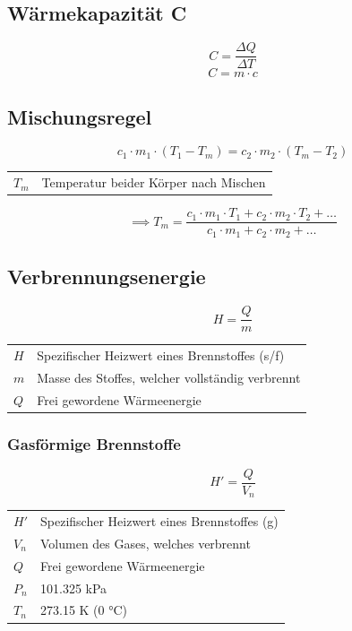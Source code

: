 \documentclass[a4paper]{IEEEtran}
\makeatletter
\newenvironment{conditions}
  {\par\vspace{\abovedisplayskip}\noindent\begin{tabular}{>{$}l<{$} @{${}={}$} l}}
  {\end{tabular}\par\vspace{\belowdisplayskip}}
\makeatother
\begin{document}
  \subsection{Wärmekapazität C}
  \begin{equation}
    C = \frac{\Delta Q}{\Delta T}
  \end{equation}
  \begin{equation}
    C = m \cdot c
  \end{equation}
  \subsection{Mischungsregel}
  \begin{equation}
    c_1 \cdot m_1 \cdot (T_1 - T_m) = c_2 \cdot m_2 \cdot (T_m - T_2)
  \end{equation}
  \begin{conditions}
    T_m & Temperatur beider Körper nach Mischen
  \end{conditions}
  \begin{equation}
    \implies T_m = \frac{c_1 \cdot m_1 \cdot T_1 + c_2 \cdot m_2 \cdot T_2 + \ldots}{c_1 \cdot m_1 + c_2 \cdot m_2 + \ldots}
  \end{equation}

  \subsection{Verbrennungsenergie}
  \begin{equation}
    H = \frac{Q}{m}
  \end{equation}
  \begin{conditions}
    H & Spezifischer Heizwert eines Brennstoffes (s/f) \\
    m & Masse des Stoffes, welcher vollständig verbrennt \\
    Q & Frei gewordene Wärmeenergie
  \end{conditions}

  \subsubsection{Gasförmige Brennstoffe}
  \begin{equation}
    H' = \frac{Q}{V_n}
  \end{equation}
  \begin{conditions}
    H' & Spezifischer Heizwert eines Brennstoffes (g) \\
    V_n & Volumen des Gases, welches verbrennt \\
    Q & Frei gewordene Wärmeenergie \\
    P_n & 101.325 \si{\kilo\pascal} \\
    T_n & 273.15 \si{\kelvin} (0 \si{\celsius})
  \end{conditions}
\end{document}
